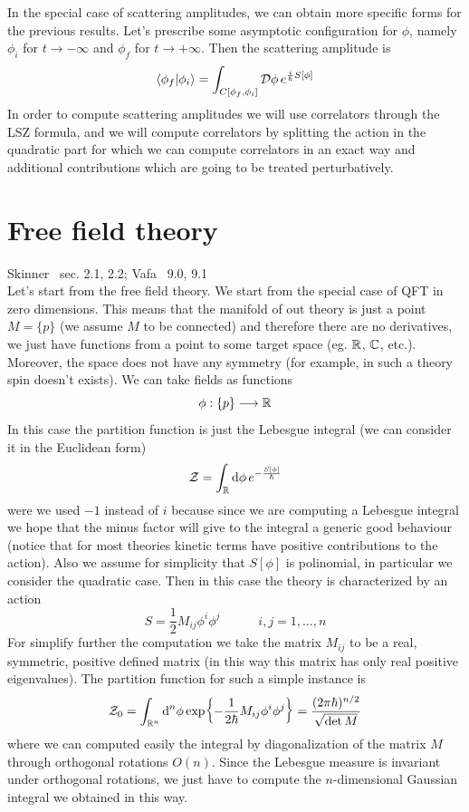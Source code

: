 \documentclass[../main/main.tex]{subfiles}
\begin{document}
In the special case of scattering amplitudes, we can obtain more specific forms for the previous results. Let's prescribe some asymptotic configuration for $\phi$, namely $\phi_i$ for $t\to-\infty$ and $\phi_f$ for $t\to+\infty$. Then the scattering amplitude is
\[\braket{\phi_f}{\phi_i}=\int_{C[\phi_f,\phi_i]}\mathcal D\phi\,e^{\frac i\hbar S[\phi]}\]
In order to compute scattering amplitudes we will use correlators through the LSZ formula, and we will compute correlators by splitting the action in the quadratic part for which we can compute correlators in an exact way and additional contributions which are going to be treated perturbatively. 


\section{Free field theory}

\textsf{Skinner~\cite{Skinner:2018aa} sec. 2.1, 2.2; Vafa~\cite{Hori:2003ic} 9.0, 9.1}\\

Let's start from the free field theory. We start from the special case of QFT in zero dimensions. This means that the manifold of out theory is just a point $M=\{p\}$ (we assume $M$ to be connected) and therefore there are no derivatives, we just have functions from a point to some target space (eg. $\mathbb{R}$, $\mathbb{C}$, etc.). Moreover, the space does not have any symmetry (for example, in such a theory spin doesn't exists). We can take fields as functions
\[\phi:\{p\}\longrightarrow\mathbb{R}\]
In this case the partition function is just the Lebesgue integral (we can consider it in the Euclidean form)
\[\mathcal Z=\int_{\mathbb{R}}\textup{d}\phi\,e^{-\frac{S[\phi]}\hbar}\]
were we used $-1$ instead of $i$ because since we are computing a Lebesgue integral we hope that the minus factor will give to the integral a generic good behaviour (notice that for most theories kinetic terms have positive contributions to the action). Also we assume for simplicity that $S[\phi]$ is polinomial, in particular we consider the quadratic case. 
Then in this case the theory is characterized by an action
\[S=\frac12M_{ij}\phi^i\phi^j\qquad\quad i,j=1,\dots,n\]
For simplify further the computation we take the matrix $M_{ij}$ to be a real, symmetric, positive defined matrix (in this way this matrix has only real positive eigenvalues).
The partition function for such a simple instance is 
\begin{equation}\label{eqn:part-func-free-0D}
\mathcal Z_0=\int_{\mathbb{R}^n}\textup{d}^n\phi \exp{-\frac1{2\hbar}M_{ij}\phi^i\phi^j}=\frac{(2\pi\hbar)^{n/2}}{\sqrt{\det M}}
\end{equation}
where we can computed easily the integral by diagonalization of the matrix $M$ through orthogonal rotations $O(n)$. Since the Lebesgue measure is invariant under orthogonal rotations, we just have to compute the $n$-dimensional Gaussian integral we obtained in this way. 
\end{document}
